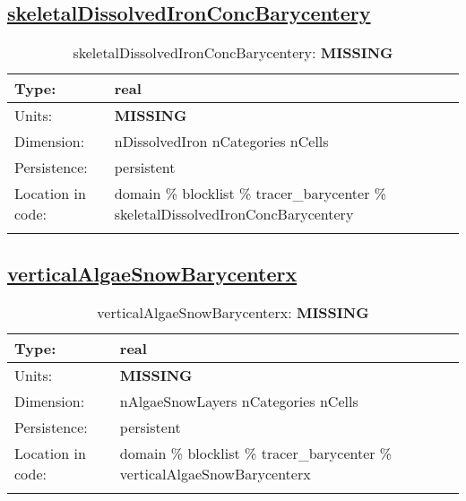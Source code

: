 \subsection[skeletalDissolvedIronConcBarycentery]{\hyperref[sec:var_tab_tracer_barycenter]{skeletalDissolvedIronConcBarycentery}}
\label{subsec:var_sec_tracer_barycenter_skeletalDissolvedIronConcBarycentery}
\begin{center}
\begin{longtable}{| p{2.0in} | p{4.0in} |}
        \hline 
        Type: & real \\
        \hline 
        Units: & {\bf \color{red} MISSING} \\
        \hline 
        Dimension: & nDissolvedIron nCategories nCells \\
        \hline 
        Persistence: & persistent \\
        \hline 
         Location in code: & domain \% blocklist \% tracer\_barycenter \% skeletalDissolvedIronConcBarycentery \\
         \hline 
    \caption{skeletalDissolvedIronConcBarycentery: {\bf \color{red} MISSING}}
\end{longtable}
\end{center}
\subsection[verticalAlgaeSnowBarycenterx]{\hyperref[sec:var_tab_tracer_barycenter]{verticalAlgaeSnowBarycenterx}}
\label{subsec:var_sec_tracer_barycenter_verticalAlgaeSnowBarycenterx}
\begin{center}
\begin{longtable}{| p{2.0in} | p{4.0in} |}
        \hline 
        Type: & real \\
        \hline 
        Units: & {\bf \color{red} MISSING} \\
        \hline 
        Dimension: & nAlgaeSnowLayers nCategories nCells \\
        \hline 
        Persistence: & persistent \\
        \hline 
         Location in code: & domain \% blocklist \% tracer\_barycenter \% verticalAlgaeSnowBarycenterx \\
         \hline 
    \caption{verticalAlgaeSnowBarycenterx: {\bf \color{red} MISSING}}
\end{longtable}
\end{center}
